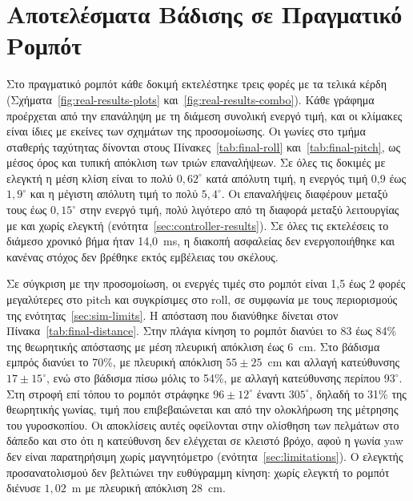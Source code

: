 \documentclass[11pt]{report}
\begin{document}
\section{Αποτελέσματα Βάδισης σε Πραγματικό Ρομπότ}
\label{sec:real-results}
Στο πραγματικό ρομπότ κάθε δοκιμή εκτελέστηκε τρεις φορές με τα τελικά κέρδη
(Σχήματα~\ref{fig:real-results-plots} και~\ref{fig:real-results-combo}). Κάθε
γράφημα προέρχεται από την επανάληψη με τη διάμεση συνολική ενεργό τιμή, και οι
κλίμακες είναι ίδιες με εκείνες των σχημάτων της προσομοίωσης. Οι γωνίες στο
τμήμα σταθερής ταχύτητας δίνονται στους Πίνακες~\ref{tab:final-roll}
και~\ref{tab:final-pitch}, ως μέσος όρος και τυπική απόκλιση των τριών
επαναλήψεων. Σε όλες τις δοκιμές με ελεγκτή η μέση κλίση είναι το πολύ
$0{,}62^\circ$ κατά απόλυτη τιμή, η ενεργός τιμή 0,9 έως $1{,}9^\circ$ και η
μέγιστη απόλυτη τιμή το πολύ $5{,}4^\circ$. Οι επαναλήψεις διαφέρουν μεταξύ τους
έως $0{,}15^\circ$ στην ενεργό τιμή, πολύ λιγότερο από τη διαφορά μεταξύ
λειτουργίας με και χωρίς ελεγκτή (ενότητα~\ref{sec:controller-results}). Σε
όλες τις εκτελέσεις το διάμεσο χρονικό βήμα ήταν 14,0~ms, η διακοπή ασφαλείας
δεν ενεργοποιήθηκε και κανένας στόχος δεν βρέθηκε εκτός εμβέλειας του σκέλους.

Σε σύγκριση με την προσομοίωση, οι ενεργές τιμές στο ρομπότ είναι 1,5 έως 2
φορές μεγαλύτερες στο pitch και συγκρίσιμες στο roll, σε συμφωνία με τους περιορισμούς
της ενότητας~\ref{sec:sim-limits}. Η απόσταση που διανύθηκε δίνεται στον
Πίνακα~\ref{tab:final-distance}. Στην πλάγια κίνηση το ρομπότ διανύει το 83 έως
84\% της θεωρητικής απόστασης με μέση πλευρική απόκλιση έως 6~cm. Στο βάδισμα
εμπρός διανύει το 70\%, με πλευρική απόκλιση $55 \pm 25$~cm και αλλαγή
κατεύθυνσης $17 \pm 15^\circ$, ενώ στο βάδισμα πίσω μόλις το 54\%, με αλλαγή
κατεύθυνσης περίπου $93^\circ$. Στη στροφή επί τόπου το ρομπότ στράφηκε
$96 \pm 12^\circ$ έναντι $305^\circ$, δηλαδή το 31\% της θεωρητικής γωνίας, τιμή
που επιβεβαιώνεται και από την ολοκλήρωση της μέτρησης του γυροσκοπίου. Οι
αποκλίσεις αυτές οφείλονται στην ολίσθηση των πελμάτων στο δάπεδο και στο ότι
η κατεύθυνση δεν ελέγχεται σε κλειστό βρόχο, αφού η γωνία yaw δεν είναι
παρατηρήσιμη χωρίς μαγνητόμετρο (ενότητα~\ref{sec:limitations}). Ο ελεγκτής
προσανατολισμού δεν βελτιώνει την ευθύγραμμη κίνηση: χωρίς ελεγκτή το ρομπότ
διένυσε $1{,}02$~m με πλευρική απόκλιση $28$~cm.
\end{document}
